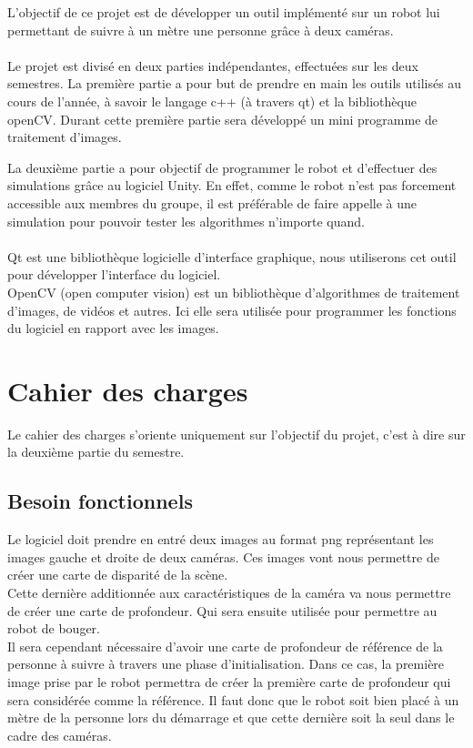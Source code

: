 \documentclass[12pt,a4paper]{report}
\begin{document}
L'objectif de ce projet est de développer un outil implémenté sur un robot lui permettant de suivre à un mètre une personne grâce à deux caméras.\\\\

Le projet est divisé en deux parties indépendantes, effectuées sur les deux semestres. 
La première partie a pour but de prendre en main les outils utilisés au cours de l'année, à savoir le langage c++ (à travers qt) et la bibliothèque openCV.
Durant cette première partie sera développé un mini programme de traitement d'images. 

La deuxième partie a pour objectif de programmer le robot et d'effectuer des simulations grâce au logiciel Unity. En effet, comme le robot n'est pas forcement accessible aux membres du groupe, il est préférable de faire appelle à une simulation pour pouvoir tester les algorithmes n'importe quand.\\\\

Qt est une bibliothèque logicielle d'interface graphique, nous utiliserons cet outil pour développer l'interface du logiciel.\\

OpenCV (open computer vision) est un bibliothèque d'algorithmes de traitement d'images, de vidéos et autres. Ici elle sera utilisée pour programmer les fonctions du logiciel en rapport avec les images.\\


\section{Cahier des charges}
Le cahier des charges s'oriente uniquement sur l'objectif du projet, c'est à dire sur la deuxième partie du semestre.
\subsection{Besoin fonctionnels}
	Le logiciel doit prendre en entré deux images au format png représentant les images gauche et droite de deux caméras.
	Ces images vont nous permettre de créer une carte de disparité de la scène.\\	
	Cette dernière additionnée aux caractéristiques de la caméra va nous permettre de créer une carte de profondeur. Qui sera ensuite utilisée pour permettre au robot de bouger.\\
	Il sera cependant nécessaire d'avoir une carte de profondeur de référence de la personne à suivre à travers une phase d'initialisation. Dans ce cas, la première image prise par le robot permettra de créer la première carte de profondeur qui sera considérée comme la référence. Il faut donc que le robot soit bien placé à un mètre de la personne lors du démarrage et que cette dernière soit la seul dans le cadre des caméras.
\end{document}
